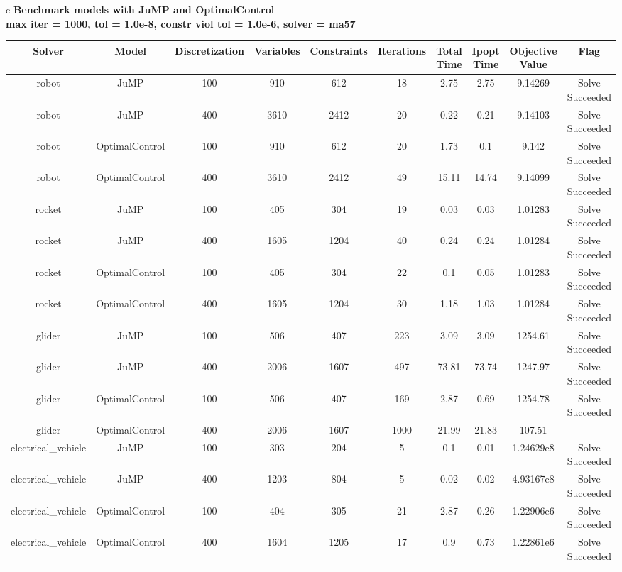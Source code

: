 \documentclass{standalone}
\begin{document}
\begin{tabular}{c}
\Large\textbf{Benchmark models with JuMP and OptimalControl}\\
\large\textbf{max iter = 1000, tol = 1.0e-8, constr viol tol = 1.0e-6, solver = ma57}\\
\begin{tabular}{cccccccccc}
  \hline
  \textbf{Solver} & \textbf{Model} & \textbf{Discretization} & \textbf{Variables} & \textbf{Constraints} & \textbf{Iterations} & \textbf{Total Time} & \textbf{Ipopt Time} & \textbf{Objective Value} & \textbf{Flag} \\\hline
  robot & JuMP & 100 & 910 & 612 & 18 & 2.75 & 2.75 & 9.14269 & Solve Succeeded \\
  robot & JuMP & 400 & 3610 & 2412 & 20 & 0.22 & 0.21 & 9.14103 & Solve Succeeded \\
  robot & OptimalControl & 100 & 910 & 612 & 20 & 1.73 & 0.1 & 9.142 & Solve Succeeded \\
  robot & OptimalControl & 400 & 3610 & 2412 & 49 & 15.11 & 14.74 & 9.14099 & Solve Succeeded \\
  rocket & JuMP & 100 & 405 & 304 & 19 & 0.03 & 0.03 & 1.01283 & Solve Succeeded \\
  rocket & JuMP & 400 & 1605 & 1204 & 40 & 0.24 & 0.24 & 1.01284 & Solve Succeeded \\
  rocket & OptimalControl & 100 & 405 & 304 & 22 & 0.1 & 0.05 & 1.01283 & Solve Succeeded \\
  rocket & OptimalControl & 400 & 1605 & 1204 & 30 & 1.18 & 1.03 & 1.01284 & Solve Succeeded \\
  glider & JuMP & 100 & 506 & 407 & 223 & 3.09 & 3.09 & 1254.61 & Solve Succeeded \\
  glider & JuMP & 400 & 2006 & 1607 & 497 & 73.81 & 73.74 & 1247.97 & Solve Succeeded \\
  glider & OptimalControl & 100 & 506 & 407 & 169 & 2.87 & 0.69 & 1254.78 & Solve Succeeded \\
  glider & OptimalControl & 400 & 2006 & 1607 & 1000 & 21.99 & 21.83 & 107.51 & \color{red}{Iterations Exceeded} \\
  electrical\_vehicle & JuMP & 100 & 303 & 204 & 5 & 0.1 & 0.01 & 1.24629e8 & Solve Succeeded \\
  electrical\_vehicle & JuMP & 400 & 1203 & 804 & 5 & 0.02 & 0.02 & 4.93167e8 & Solve Succeeded \\
  electrical\_vehicle & OptimalControl & 100 & 404 & 305 & 21 & 2.87 & 0.26 & 1.22906e6 & Solve Succeeded \\
  electrical\_vehicle & OptimalControl & 400 & 1604 & 1205 & 17 & 0.9 & 0.73 & 1.22861e6 & Solve Succeeded \\\hline
\end{tabular}
\end{tabular}
\end{document}
